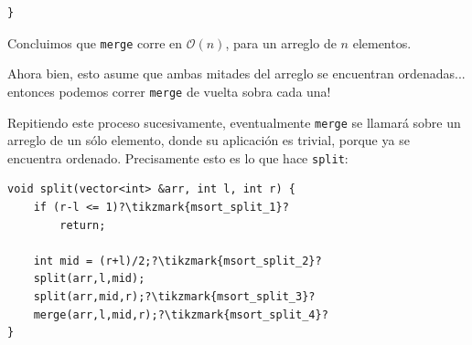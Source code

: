 \documentclass{beamer}
\begin{document}
\begin{frame}
        \begin{verbatim}
}
        \end{verbatim}
    \end{frame}

    \begin{frame}
        Concluimos que \texttt{merge} corre en $\mathcal{O}(n)$, para un arreglo de $n$ elementos. \vspace{8pt} \pause

        Ahora bien, esto asume que ambas mitades del arreglo se encuentran ordenadas... \pause entonces podemos correr \texttt{merge} de vuelta sobra cada una! \pause \vspace{8pt}

        Repitiendo este proceso sucesivamente, eventualmente \texttt{merge} se llamará sobre un arreglo de un sólo elemento, donde su aplicación es trivial, porque ya se encuentra ordenado. \pause Precisamente esto es lo que hace \texttt{split}: \pause \vspace{4pt}

        \begin{verbatim}
void split(vector<int> &arr, int l, int r) {
    if (r-l <= 1)?\tikzmark{msort_split_1}?
        return;

    int mid = (r+l)/2;?\tikzmark{msort_split_2}?
    split(arr,l,mid);
    split(arr,mid,r);?\tikzmark{msort_split_3}?
    merge(arr,l,mid,r);?\tikzmark{msort_split_4}?
}
        \end{verbatim}
        \vspace{-12pt}

            \onslide<10->{Notar que \texttt{split} ordena el intervalo $[l,r)$ del arreglo, pasándolo cada vez por referencia para evitar costos adicionales.}
    \end{frame}
\end{document}
